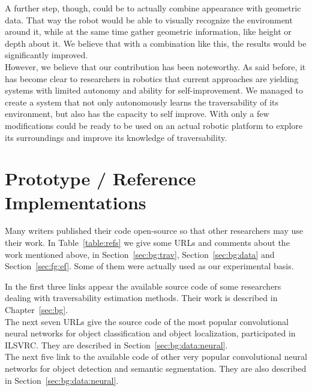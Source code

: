 \documentclass[12pt,a4paper,table,dvipsnames,tikz]{report}
\newcommand{\acronym}{\MakeUppercase}
\newcommand{\bl}[1]{{\hypersetup{linkcolor=blue}#1}}
\begin{document}
	
	A further step, though, could be to actually combine appearance with geometric 
	data. That way the robot would be able to visually recognize the environment 
	around it, while at the same time gather geometric information, like height or 
	depth about it. We believe that with a combination like this, the results would 
	be significantly improved.
	\\
	
	However, we believe that our contribution has been noteworthy. As said before, it 
	has become clear to researchers in robotics that current approaches are yielding 
	systems with limited autonomy and ability for self-improvement. We managed to 
	create a system that not only autonomously learns the traversability of its 
	environment, but also has the capacity to self improve. With only a few modifications 
	could be ready to be used on an actual robotic platform to explore its surroundings 
	and improve its knowledge of traversability.
	
	
	
	\appendix
	\chapter{Prototype / Reference Implementations}
	\label{app:impl}
	
	Many writers published their code open-source so that other researchers may 
	use their work. In Table~\bl{\ref{table:refs}} we give some \acronym{url}s and 
	comments about the work mentioned above, in Section~\ref{sec:bg:trav}, 
	Section~\ref{sec:bg:data} and Section~\ref{sec:fg:ef}. Some of them were 
	actually used as our experimental basis.
	\\
	
	\begin{table}[h]
		\centering	
			
	\end{table}
	
	In the first three links appear the available source code of some researchers dealing 
	with traversability estimation methods. Their work is described in Chapter~\ref{sec:bg}.
	\\
	
	The next seven \acronym{url}s give the source code of the most popular convolutional 
	neural networks for object classification and object localization, participated in 
	\acronym{ilsvrc}. They are described in Section~\ref{sec:bg:data:neural}.
	\\
	
	The next five link to the available code of other very popular convolutional neural 
	networks for object detection and semantic segmentation. They are also described in 
	Section~\ref{sec:bg:data:neural}.
	\\
	
\end{document}
